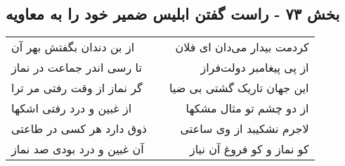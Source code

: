 \begin{center}
\section*{بخش ۷۳ - راست گفتن ابلیس ضمیر خود را به معاویه}
\label{sec:sh073}
\begin{longtable}{l p{0.5cm} r}
از بن دندان بگفتش بهر آن
&&
کردمت بیدار می‌دان ای فلان
\\
تا رسی اندر جماعت در نماز
&&
از پی پیغامبر دولت‌فراز
\\
گر نماز از وقت رفتی مر ترا
&&
این جهان تاریک گشتی بی ضیا
\\
از غبین و درد رفتی اشکها
&&
از دو چشم تو مثال مشکها
\\
ذوق دارد هر کسی در طاعتی
&&
لاجرم نشکیبد از وی ساعتی
\\
آن غبین و درد بودی صد نماز
&&
کو نماز و کو فروغ آن نیاز
\\
\end{longtable}
\end{center}
